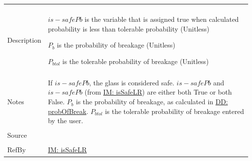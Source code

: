 \documentclass[12pt]{article}
\begin{document}
\begin{minipage}{\textwidth}
\begin{tabular}{>{\raggedright}p{}>{\raggedright\arraybackslash}p{}}
          \\ \midrule \\
          Description & \begin{symbDescription}
                        \item{$is-safePb$ is the variable that is assigned true when calculated probability is less than tolerable probability (Unitless)}
                        \item{${P_{b}}$ is the probability of breakage (Unitless)}
                        \item{${P_{btol}}$ is the tolerable probability of breakage (Unitless)}
                        \end{symbDescription}
          \\ \midrule \\
          Notes & If $is-safePb$, the glass is considered safe. $is-safePb$ and $is-safePb$ (from \hyperref[IM:isSafeLR]{IM: isSafeLR}) are either both True or both False. ${P_{b}}$ is the probability of breakage, as calculated in \hyperref[DD:probOfBreak]{DD: probOfBreak}. ${P_{btol}}$ is the tolerable probability of breakage entered by the user.
          \\ \midrule \\
          Source & \cite{astm2009}
          \\ \midrule \\
          RefBy & \hyperref[IM:isSafeLR]{IM: isSafeLR}
          \\ \bottomrule
          \end{tabular}
          \end{minipage}
\par~
\end{document}

